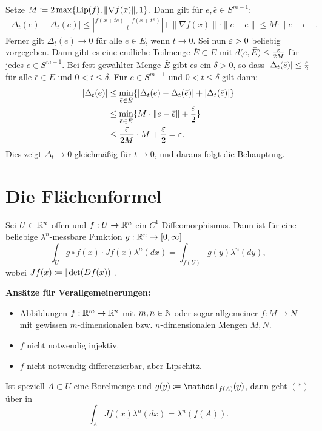 \documentclass[a4paper,twoside,DIV15,BCOR12mm]{scrbook}
\newcommand{\ind}{\mathds 1}
\DeclareMathOperator{\Lip}{Lip}
\begin{document}
\begin{beweis}
\begin{enumerate}[{Teil} 1:]
Setze $M\da 2\max\{\Lip(f), \|\nabla f(x)\|, 1\}$. Dann gilt für $e,\bar e\in S^{m-1}$:
\begin{align*}
|\Delta_t (e) - \Delta_t(\bar e)|
\le | \frac{f(x + t e) - f(x + t \bar e)}t | + \|\nabla f(x) \| \cdot \|e-\bar e\|
\le M \cdot \|e-\bar e\|.
\end{align*}
Ferner gilt $\Delta_t(e) \to 0$ für alle $e\in E$, wenn $t \to 0$. 
Sei nun $\varepsilon>0$ beliebig vorgegeben. Dann gibt es eine endliche Teilmenge $\bar E\subset E$ mit $d(e,\bar E) \le \frac{\varepsilon}{2M}$ für jedes $e\in S^{m-1}$. Bei fest gewählter Menge $\bar{E}$ gibt es ein $\delta>0$, so dass $|\Delta_{t} (\bar e) | \le \frac{\varepsilon}2$ für alle $\bar e\in\bar E$ und $0<t\le \delta$. Für $e\in S^{m-1}$ und $0<t\le\delta$ gilt dann:
\begin{align*}
|\Delta_{t} (e)|
&\le \min_{\bar e\in\bar E} \{ |\Delta_{t}(e) - \Delta_{t}(\bar e)| + |\Delta_{t}(\bar e)|\} \\
&\le \min_{\bar e\in\bar E} \{ M \cdot \|e-\bar e\| + \frac{\varepsilon}2\} \\
&\le \frac{\varepsilon}{2M} \cdot M + \frac{\varepsilon}2 = \varepsilon.
\end{align*}
Dies zeigt $\Delta_t\to 0$ gleichmäßig für $t\to 0$, und daraus folgt die Behauptung.
\end{enumerate}
\end{beweis}

\section{Die Flächenformel}
Sei $U\subset\mathbb{R}^n$ offen und $f:U\to\mathbb{R}^n$ ein $C^1$-Diffeomorphismus. Dann ist für eine beliebige 
$\lambda^n$-messbare Funktion $g:\mathbb{R}^n\to [0,\infty]$
\begin{equation}
\int_U g\circ f(x)\cdot Jf(x) \lambda^n(dx)=\int_{f(U)}g(y)\lambda^n(dy),\tag{$*$}
\end{equation}
wobei $Jf(x)\da |\det(Df(x))|$.

\textbf{Ansätze für Verallgemeinerungen:}
\begin{itemize}
\item Abbildungen $f:\mathbb{R}^m\to\mathbb{R}^n$ mit $m,n\in\mathbb{N}$ oder sogar allgemeiner $f:M\to N$ mit gewissen $m$-dimensionalen bzw. $n$-dimensionalen Mengen $M,N$.
\item $f$ nicht notwendig injektiv.
\item $f$ nicht notwendig differenzierbar, aber Lipschitz.
\end{itemize}

Ist speziell $A\subset U$ eine Borelmenge und $g(y)\da \ind_{f(A)}(y)$, dann geht $(*)$ über in
\[
\int_A Jf(x)\lambda^n(dx)=\lambda^n(f(A)).
\]
\end{document}
